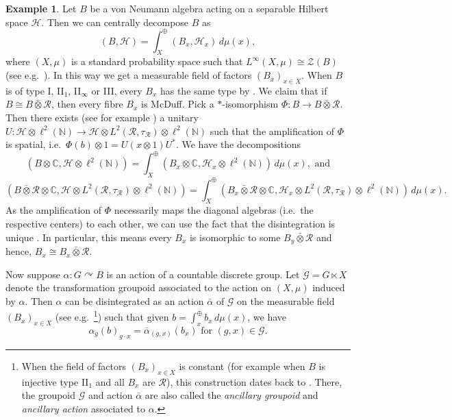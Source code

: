 \documentclass[11pt,a4paper]{article}
\theoremstyle{definition}
\newtheorem{example}[theorem]{Example}
\theoremstyle{remark}
\numberwithin{equation}{section}
\numberwithin{theorem}{section}
\newcommand{\N}{\mathbb{N}}
\newcommand{\C}{\mathbb{C}}
\newcommand{\acts}{\curvearrowright}
\begin{document}
\begin{example} \label{ex:central_decomposition}
Let $B$ be a von Neumann algebra acting on a separable Hilbert space $\mathcal{H}$. Then we can centrally decompose $B$ as 
\[ (B, \mathcal{H}) = \int_{X}^\oplus (B_x, \mathcal{H}_x)\, d\mu(x), \]
where $(X,\mu)$ is a standard probability space such that $L^\infty(X,\mu) \cong \mathcal{Z}(B)$ (see e.g.\ \cite[Theorem IV.8.21]{Takesaki02}).
In this way we get a measurable field of factors $(B_x)_{x \in X}$. When $B$ is of type I, II$_1$, II$_\infty$ or III, every $B_x$ has the same type by \cite[Corollary V.6.7]{Takesaki02}.
We claim that if $B \cong B \bar{\otimes} \mathcal{R}$, then every fibre $B_x$ is McDuff.
Pick a $*$-isomorphism $\Phi\colon B \rightarrow B \bar{\otimes} \mathcal{R}$.
Then there exists (see for example \cite[Theorem III.2.2.8]{Blackadar}) a unitary $U\colon \mathcal{H} \otimes \ell^2(\N) \rightarrow \mathcal{H} \otimes L^2(\mathcal{R}, \tau_\mathcal{R}) \otimes \ell^2(\N)$ such that the amplification of $\Phi$ is spatial, i.e.\ $\Phi(b) \otimes 1 = U(x \otimes 1)U^*$.
We have the decompositions
\[(B \otimes \C, \mathcal{H} \otimes \ell^2(\N)) =\int_X^\oplus (B_x \otimes \C, \mathcal{H}_x \otimes \ell^2(\N)) \, d \mu(x),\text{ and}\]
\[(B \bar{\otimes} \mathcal{R} \otimes \C,\mathcal{H} \otimes L^2(\mathcal{R}, \tau_\mathcal{R}) \otimes \ell^2(\N))  = \int_X^\oplus \left(B_x \bar{\otimes}\mathcal{R} \otimes \C, \mathcal{H}_x \otimes L^2(\mathcal{R}, \tau_\mathcal{R}) \otimes \ell^2(\N)\right) \, d\mu(x).\]
As the amplification of $\Phi$ necessarily maps the diagonal algebras (i.e.\ the respective centers) to each other, we can use the fact that the disintegration is unique \cite[Theorem 8.23]{Takesaki02}. In particular, this means every $B_x$ is isomorphic to some $B_y \bar{\otimes} \mathcal{R}$ and hence, $B_x \cong B_x \bar{\otimes} \mathcal{R}$. 

Now suppose $\alpha\colon G \acts B$ is an action of a countable discrete group. 
Let ${\mathcal{G} = G \ltimes X}$ denote the transformation groupoid associated to the action on $(X, \mu)$ induced by $\alpha$.
 Then $\alpha$ can be disintegrated as an action $\bar{\alpha}$ of $\mathcal{G}$ on the measurable field $(B_x)_{x \in X}$ (see e.g.\ \cite[Corollary X.3.12]{Takesaki02}\footnote{When the field of factors $(B_x)_{x \in X}$ is constant (for example when $B$ is injective type II$_1$ and all $B_x$ are $\mathcal{R}$), this construction dates back to \cite{SutherlandTakesaki89}. 
 There, the groupoid $\mathcal{G}$ and action $\bar{\alpha}$ are also called the \emph{ancillary groupoid} and \emph{ancillary action} associated to $\alpha$. }) such that given $b= \int_x^\oplus b_x\,  d \mu(x)$, we have
\[\alpha_g(b)_{g \cdot x} = \bar{\alpha}_{(g,x)}(b_{x}) \text{ for } (g,x) \in \mathcal{G}.\]


\end{example}
\end{document}
